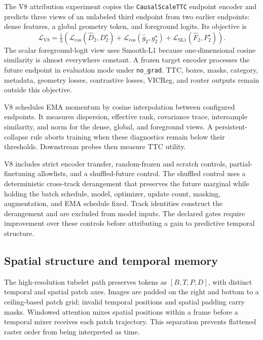 The V8 attribution experiment copies the \texttt{CausalScaleTTC} endpoint encoder and predicts three views of an unlabeled third endpoint from two earlier endpoints: dense features, a global geometry token, and foreground logits. Its objective is
\begin{equation}
 \mathcal L_{\mathrm{V8}}=\tfrac13\left(
 \mathcal L_{\cos}(\widehat D_2,D_2^\star)
 +\mathcal L_{\cos}(\widehat g_2,g_2^\star)
 +\mathcal L_{\mathrm{SL1}}(\widehat F_2,F_2^\star)\right).
\end{equation}
The scalar foreground-logit view uses Smooth-L1 because one-dimensional cosine similarity is almost everywhere constant. A frozen target encoder processes the future endpoint in evaluation mode under \texttt{no\_grad}. TTC, boxes, masks, category, metadata, geometry losses, contrastive losses, VICReg, and router outputs remain outside this objective. 

V8 schedules EMA momentum by cosine interpolation between configured endpoints. It measures dispersion, effective rank, covariance trace, intersample similarity, and norm for the dense, global, and foreground views. A persistent-collapse rule aborts training when these diagnostics remain below their thresholds. Downstream probes then measure TTC utility.

V8 includes strict encoder transfer, random-frozen and scratch controls, partial-finetuning allowlists, and a shuffled-future control. The shuffled control uses a deterministic cross-track derangement that preserves the future marginal while holding the batch schedule, model, optimizer, update count, masking, augmentation, and EMA schedule fixed. Track identities construct the derangement and are excluded from model inputs. The declared gates require improvement over these controls before attributing a gain to predictive temporal structure. 

\subsection{Spatial structure and temporal memory}
The high-resolution tubelet path preserves tokens as $[B,T,P,D]$, with distinct temporal and spatial patch axes. Images are padded on the right and bottom to a ceiling-based patch grid; invalid temporal positions and spatial padding carry masks. Windowed attention mixes spatial positions within a frame before a temporal mixer receives each patch trajectory. This separation prevents flattened raster order from being interpreted as time. 

